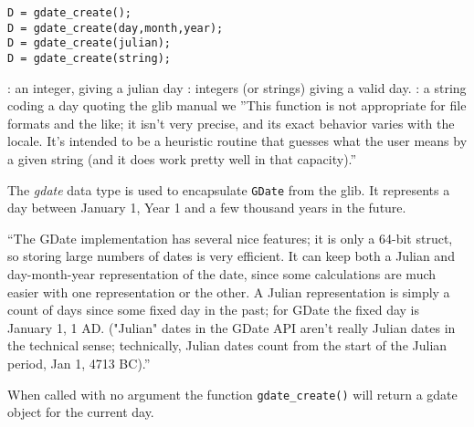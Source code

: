 
\begin{mandesc}
\end{mandesc}

\begin{calling_sequence}
\begin{verbatim}
D = gdate_create();
D = gdate_create(day,month,year);
D = gdate_create(julian);
D = gdate_create(string);
\end{verbatim}
\end{calling_sequence}
\begin{parameters}
  \begin{varlist}
    : an integer, giving a julian day 
    : integers (or strings) giving a valid day.
    : a string coding a day quoting the glib manual we ''This function is not appropriate for file formats and the like; it isn't very precise, and its exact behavior varies with the locale. It's intended to be a heuristic routine that guesses what the user means by a given string (and it does work pretty well in that capacity).''
  \end{varlist}
\end{parameters}

\begin{mandescription}
The \emph{gdate} data type is used to encapsulate \verb+GDate+ from the glib. It 
represents a day between January 1, Year 1 and a few thousand years in the future.

``The GDate implementation has several nice features; it is only a 64-bit struct, 
so storing large numbers of dates is very efficient. It can keep both a Julian 
and day-month-year representation of the date, since some calculations are much 
easier with one representation or the other. A Julian representation is simply a
 count of days since some fixed day in the past; for 
GDate the fixed day is January 1, 1 AD. ("Julian" dates in the GDate API aren't 
really Julian dates in the technical sense; technically, Julian dates count from 
the start of the Julian period, Jan 1, 4713 BC).'' 

When called with no argument the function \verb+gdate_create()+ will return a 
gdate object for the current day.

\end{mandescription}


